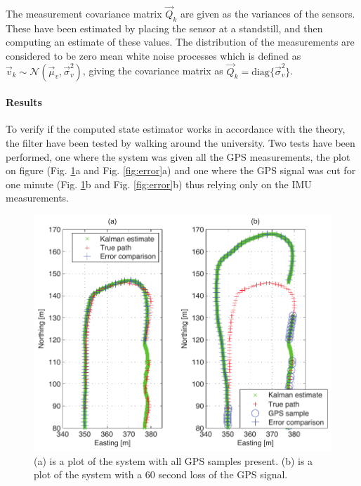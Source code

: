 \documentclass[a0,portrait]{a0poster}
\begin{document}
\begin{center}
{\paragraph{}
The measurement covariance matrix $\vec{Q}_k$ are given as the variances of the sensors. These have been estimated by placing the sensor at a standstill, and then computing an estimate of these values. The distribution of the measurements are considered to be zero mean white noise processes which is defined as $\vec{v}_k \sim \mathcal{N}(\vec{\mu}_v,\vec{\sigma}^2_v)$, giving the covariance matrix as $\vec{Q}_k = \text{diag}\{\vec{\sigma}^2_v\}$. 

\paragraph{Results}
To verify if the computed state estimator works in accordance with the theory, the filter have been tested by walking around the university. Two tests have been performed, one where the system was given all the GPS measurements, the plot on figure (Fig. \ref{fig:path}a and Fig. \ref{fig:error}a) and one where the GPS signal was cut for one minute (Fig. \ref{fig:path}b and Fig. \ref{fig:error}b) thus relying only on the IMU measurements.
\begin{figure}
	\centering %
	\includegraphics[width=\threecolwidth]{img/track}
  	\caption{(a) is a plot of the system with all GPS samples present. (b) is a plot of the system with a 60 second loss of the GPS signal.}
	\label{fig:path}
\end{figure}
}
\end{center}
\end{document}
